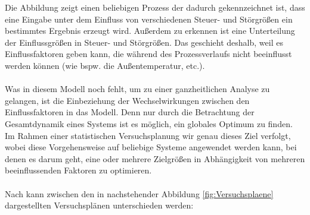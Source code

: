 \documentclass[
fontsize=10pt, 
listof = totoc,
parskip = half	
]{report}
\begin{document}
\noindent Die Abbildung zeigt einen beliebigen Prozess der dadurch gekennzeichnet ist, dass eine Eingabe unter dem Einfluss von verschiedenen Steuer- und Störgrößen ein bestimmtes Ergebnis erzeugt wird. Außerdem zu erkennen ist eine Unterteilung der Einflussgrößen in Steuer- und Störgrößen. Das geschieht deshalb, weil es Einflussfaktoren geben kann, die während des Prozessverlaufs nicht beeinflusst werden können (wie bspw. die Außentemperatur, etc.).
\\\\
\noindent Was in diesem Modell noch fehlt, um zu einer ganzheitlichen Analyse zu gelangen, ist die Einbeziehung der Wechselwirkungen zwischen den Einflussfaktoren in das Modell. Denn nur durch die Betrachtung der Gesamtdynamik eines Systems ist es möglich, ein globales Optimum zu finden. Im Rahmen einer statistischen Versuchsplanung wir genau dieses Ziel verfolgt, wobei diese Vorgehensweise auf beliebige Systeme angewendet werden kann, bei denen es darum geht, eine oder mehrere Zielgrößen in Abhängigkeit von mehreren beeinflussenden Faktoren zu optimieren. 
\\\\
Nach \cite{schiefer_2018} kann zwischen den in nachstehender Abbildung \ref{fig:Versuchsplaene} dargestellten Versuchsplänen unterschieden werden:
\end{document}
